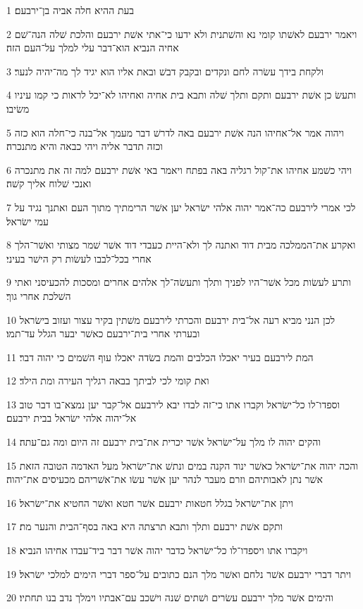 \par 1 בעת ההיא חלה אביה בן־ירבעם׃
\par 2 ויאמר ירבעם לאשׁתו קומי נא והשׁתנית ולא ידעו כי־אתי אשׁת ירבעם והלכת שׁלה הנה־שׁם אחיה הנביא הוא־דבר עלי למלך על־העם הזה׃
\par 3 ולקחת בידך עשׂרה לחם ונקדים ובקבק דבשׁ ובאת אליו הוא יגיד לך מה־יהיה לנער׃
\par 4 ותעשׂ כן אשׁת ירבעם ותקם ותלך שׁלה ותבא בית אחיה ואחיהו לא־יכל לראות כי קמו עיניו משׂיבו׃
\par 5 ויהוה אמר אל־אחיהו הנה אשׁת ירבעם באה לדרשׁ דבר מעמך אל־בנה כי־חלה הוא כזה וכזה תדבר אליה ויהי כבאה והיא מתנכרה׃
\par 6 ויהי כשׁמע אחיהו את־קול רגליה באה בפתח ויאמר באי אשׁת ירבעם למה זה את מתנכרה ואנכי שׁלוח אליך קשׁה׃
\par 7 לכי אמרי לירבעם כה־אמר יהוה אלהי ישׂראל יען אשׁר הרימתיך מתוך העם ואתנך נגיד על עמי ישׂראל׃
\par 8 ואקרע את־הממלכה מבית דוד ואתנה לך ולא־היית כעבדי דוד אשׁר שׁמר מצותי ואשׁר־הלך אחרי בכל־לבבו לעשׂות רק הישׁר בעיני׃
\par 9 ותרע לעשׂות מכל אשׁר־היו לפניך ותלך ותעשׂה־לך אלהים אחרים ומסכות להכעיסני ואתי השׁלכת אחרי גוך׃
\par 10 לכן הנני מביא רעה אל־בית ירבעם והכרתי לירבעם משׁתין בקיר עצור ועזוב בישׂראל ובערתי אחרי בית־ירבעם כאשׁר יבער הגלל עד־תמו׃
\par 11 המת לירבעם בעיר יאכלו הכלבים והמת בשׂדה יאכלו עוף השׁמים כי יהוה דבר׃
\par 12 ואת קומי לכי לביתך בבאה רגליך העירה ומת הילד׃
\par 13 וספדו־לו כל־ישׂראל וקברו אתו כי־זה לבדו יבא לירבעם אל־קבר יען נמצא־בו דבר טוב אל־יהוה אלהי ישׂראל בבית ירבעם׃
\par 14 והקים יהוה לו מלך על־ישׂראל אשׁר יכרית את־בית ירבעם זה היום ומה גם־עתה׃
\par 15 והכה יהוה את־ישׂראל כאשׁר ינוד הקנה במים ונתשׁ את־ישׂראל מעל האדמה הטובה הזאת אשׁר נתן לאבותיהם וזרם מעבר לנהר יען אשׁר עשׂו את־אשׁריהם מכעיסים את־יהוה׃
\par 16 ויתן את־ישׂראל בגלל חטאות ירבעם אשׁר חטא ואשׁר החטיא את־ישׂראל׃
\par 17 ותקם אשׁת ירבעם ותלך ותבא תרצתה היא באה בסף־הבית והנער מת׃
\par 18 ויקברו אתו ויספדו־לו כל־ישׂראל כדבר יהוה אשׁר דבר ביד־עבדו אחיהו הנביא׃
\par 19 ויתר דברי ירבעם אשׁר נלחם ואשׁר מלך הנם כתובים על־ספר דברי הימים למלכי ישׂראל׃
\par 20 והימים אשׁר מלך ירבעם עשׂרים ושׁתים שׁנה וישׁכב עם־אבתיו וימלך נדב בנו תחתיו׃
